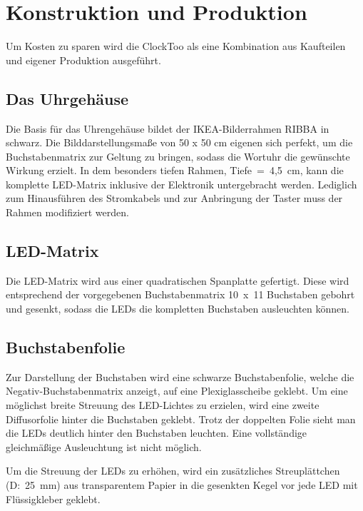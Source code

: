 
\section{Konstruktion und Produktion}
\label{sec:KonstruktionFertigung}

\begin{multicols}{2}
Um Kosten zu sparen wird die ClockToo als eine Kombination aus Kaufteilen und eigener Produktion ausgeführt. 

\subsection{Das Uhrgehäuse}

Die Basis für das Uhrengehäuse bildet der IKEA-Bilderrahmen RIBBA in schwarz. Die Bilddarstellungsmaße von 50 x 50 cm eigenen sich perfekt, um die Buchstabenmatrix zur Geltung zu bringen, sodass die Wortuhr die gewünschte Wirkung erzielt. In dem besonders tiefen Rahmen,  Tiefe~=~4,5~cm, kann die komplette LED-Matrix inklusive der Elektronik untergebracht werden. Lediglich zum Hinausführen des Stromkabels und zur Anbringung der Taster muss der Rahmen modifiziert werden. 

\subsection{LED-Matrix}

Die LED-Matrix wird aus einer quadratischen Spanplatte gefertigt. Diese wird entsprechend der vorgegebenen Buchstabenmatrix 10~x~11 Buchstaben gebohrt und gesenkt, sodass die LEDs die kompletten Buchstaben ausleuchten können. 

\subsection{Buchstabenfolie}

Zur Darstellung der Buchstaben wird eine schwarze Buchstabenfolie, welche die Negativ-Buchstabenmatrix anzeigt, auf eine Plexiglasscheibe geklebt. Um eine möglichst breite Streuung des LED-Lichtes zu erzielen, wird eine zweite Diffusorfolie hinter die Buchstaben geklebt. Trotz der doppelten Folie sieht man die LEDs deutlich hinter den Buchstaben leuchten. Eine vollständige gleichmäßige Ausleuchtung ist nicht möglich. 

Um die Streuung der LEDs zu erhöhen, wird ein zusätzliches Streuplättchen (D:~25~mm) aus transparentem Papier in die gesenkten Kegel vor jede LED mit Flüssigkleber geklebt. 



\end{multicols}

